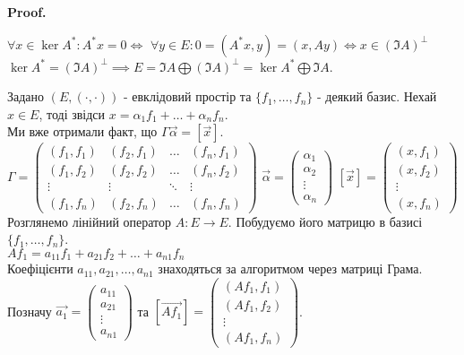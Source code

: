 \documentclass[a4paper, 10pt]{article}
\makeatletter
\theoremstyle{theoremdd}
\renewenvironment{proof}[1][Proof.\\]{\par
\pushQED{\hfill \qed}%
\normalfont \topsep6\p@\@plus6\p@\relax
\trivlist
\item\relax
{\bfseries
#1\@addpunct{.}}\hspace\labelsep\ignorespaces
}{%
\popQED\endtrivlist\@endpefalse
}
\makeatother
\begin{document}
\begin{proof}
$\forall x \in \ker A^*: A^* x = 0 \iff$ $\forall y \in E: 0 = (A^*x,y) = (x, Ay) \iff x \in (\Im A)^{\perp}$\\
$\ker A^* = (\Im A)^{\perp} \implies E = \Im A \bigoplus (\Im A)^{\perp} = \ker A^* \bigoplus \Im A$.
\end{proof}

Задано $(E,(\cdot,\cdot))$ - евклідовий простір та $\{f_1,\dots,f_n\}$ - деякий базис. Нехай $x \in E$, тоді звідси $x = \alpha_1 f_1 + \dots + \alpha_n f_n$.\\
Ми вже отримали факт, що $\Gamma \vec{\alpha} = [\vec{x}]$.\\
$\Gamma = \begin{pmatrix}
(f_1,f_1) & (f_2,f_1) & \dots & (f_n,f_1) \\
(f_1,f_2) & (f_2,f_2) & \dots & (f_n,f_2) \\
\vdots & \vdots & \ddots & \vdots \\
(f_1,f_n) & (f_2,f_n) & \dots & (f_n,f_n)
\end{pmatrix}$ \hspace{1cm}
$\vec{\alpha} = \begin{pmatrix}
\alpha_1 \\ \alpha_2 \\ \vdots \\ \alpha_n
\end{pmatrix}$ \hspace{1cm}
$[\vec{x}] = \begin{pmatrix}
(x,f_1) \\ (x,f_2) \\ \vdots \\ (x,f_n)
\end{pmatrix}$
\\
Розглянемо лінійний оператор $A: E \to E$. Побудуємо його матрицю в базисі $\{f_1,\dots,f_n\}$.\\
$Af_1 = a_{11}f_1 + a_{21}f_2 + \dots + a_{n1}f_n$\\
Коефіцієнти $a_{11},a_{21},\dots,a_{n1}$ знаходяться за алгоритмом через матриці Грама.\\
Позначу $\vec{a_1} = \begin{pmatrix}
a_{11} \\ a_{21} \\ \vdots \\ a_{n1}
\end{pmatrix}$ та $[\vec{Af_1}] = \begin{pmatrix}
(Af_1,f_1) \\ (Af_1,f_2) \\ \vdots \\ (Af_1,f_n)
\end{pmatrix}$.\\
\end{document}
